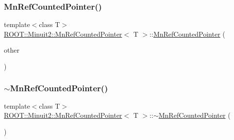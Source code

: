 \subsubsection{\texorpdfstring{MnRefCountedPointer()}{MnRefCountedPointer()}\hspace{0.1cm}{\footnotesize\ttfamily [3/9]}}
{\footnotesize\ttfamily template$<$class T$>$ \\
\mbox{\hyperlink{classROOT_1_1Minuit2_1_1MnRefCountedPointer}{R\+O\+O\+T\+::\+Minuit2\+::\+Mn\+Ref\+Counted\+Pointer}}$<$ T $>$\+::\mbox{\hyperlink{classROOT_1_1Minuit2_1_1MnRefCountedPointer}{Mn\+Ref\+Counted\+Pointer}} (\begin{DoxyParamCaption}\item[{const \mbox{\hyperlink{classROOT_1_1Minuit2_1_1MnRefCountedPointer}{Mn\+Ref\+Counted\+Pointer}}$<$ T $>$ \&}]{other }\end{DoxyParamCaption})\hspace{0.3cm}{\ttfamily [inline]}}

\mbox{\label{classROOT_1_1Minuit2_1_1MnRefCountedPointer_ae3bdd5d92c9c44bd3490954bca60fd47}} 
\subsubsection{\texorpdfstring{$\sim$MnRefCountedPointer()}{~MnRefCountedPointer()}\hspace{0.1cm}{\footnotesize\ttfamily [1/3]}}
{\footnotesize\ttfamily template$<$class T$>$ \\
\mbox{\hyperlink{classROOT_1_1Minuit2_1_1MnRefCountedPointer}{R\+O\+O\+T\+::\+Minuit2\+::\+Mn\+Ref\+Counted\+Pointer}}$<$ T $>$\+::$\sim$\mbox{\hyperlink{classROOT_1_1Minuit2_1_1MnRefCountedPointer}{Mn\+Ref\+Counted\+Pointer}} (\begin{DoxyParamCaption}{ }\end{DoxyParamCaption})\hspace{0.3cm}{\ttfamily [inline]}}

\mbox{\label{classROOT_1_1Minuit2_1_1MnRefCountedPointer_ab597b297b8bc186cf67a2c6874c2d169}} 
